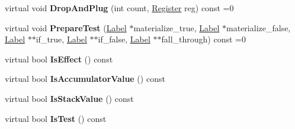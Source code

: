 \begin{DoxyCompactItemize}
\item 
virtual void {\bfseries Drop\+And\+Plug} (int count, \hyperlink{structv8_1_1internal_1_1_register}{Register} reg) const  =0\hypertarget{classv8_1_1internal_1_1_full_code_generator_1_1_b_a_s_e___e_m_b_e_d_d_e_d_af2576f5423dda73a46381f74bd0c573e}{}\label{classv8_1_1internal_1_1_full_code_generator_1_1_b_a_s_e___e_m_b_e_d_d_e_d_af2576f5423dda73a46381f74bd0c573e}

\item 
virtual void {\bfseries Prepare\+Test} (\hyperlink{classv8_1_1internal_1_1_label}{Label} $\ast$materialize\+\_\+true, \hyperlink{classv8_1_1internal_1_1_label}{Label} $\ast$materialize\+\_\+false, \hyperlink{classv8_1_1internal_1_1_label}{Label} $\ast$$\ast$if\+\_\+true, \hyperlink{classv8_1_1internal_1_1_label}{Label} $\ast$$\ast$if\+\_\+false, \hyperlink{classv8_1_1internal_1_1_label}{Label} $\ast$$\ast$fall\+\_\+through) const  =0\hypertarget{classv8_1_1internal_1_1_full_code_generator_1_1_b_a_s_e___e_m_b_e_d_d_e_d_a62b86663f5f43d5c799df82e2c3deaaa}{}\label{classv8_1_1internal_1_1_full_code_generator_1_1_b_a_s_e___e_m_b_e_d_d_e_d_a62b86663f5f43d5c799df82e2c3deaaa}

\item 
virtual bool {\bfseries Is\+Effect} () const \hypertarget{classv8_1_1internal_1_1_full_code_generator_1_1_b_a_s_e___e_m_b_e_d_d_e_d_a1a32384b0a0099141c693a79b6205d02}{}\label{classv8_1_1internal_1_1_full_code_generator_1_1_b_a_s_e___e_m_b_e_d_d_e_d_a1a32384b0a0099141c693a79b6205d02}

\item 
virtual bool {\bfseries Is\+Accumulator\+Value} () const \hypertarget{classv8_1_1internal_1_1_full_code_generator_1_1_b_a_s_e___e_m_b_e_d_d_e_d_a4454fec245f9e13056892bad19974c72}{}\label{classv8_1_1internal_1_1_full_code_generator_1_1_b_a_s_e___e_m_b_e_d_d_e_d_a4454fec245f9e13056892bad19974c72}

\item 
virtual bool {\bfseries Is\+Stack\+Value} () const \hypertarget{classv8_1_1internal_1_1_full_code_generator_1_1_b_a_s_e___e_m_b_e_d_d_e_d_a9889cb63c73be20518922961f4633737}{}\label{classv8_1_1internal_1_1_full_code_generator_1_1_b_a_s_e___e_m_b_e_d_d_e_d_a9889cb63c73be20518922961f4633737}

\item 
virtual bool {\bfseries Is\+Test} () const \hypertarget{classv8_1_1internal_1_1_full_code_generator_1_1_b_a_s_e___e_m_b_e_d_d_e_d_aae2288ec90ba108eb2365e1ced4a7267}{}\label{classv8_1_1internal_1_1_full_code_generator_1_1_b_a_s_e___e_m_b_e_d_d_e_d_aae2288ec90ba108eb2365e1ced4a7267}

\end{DoxyCompactItemize}

